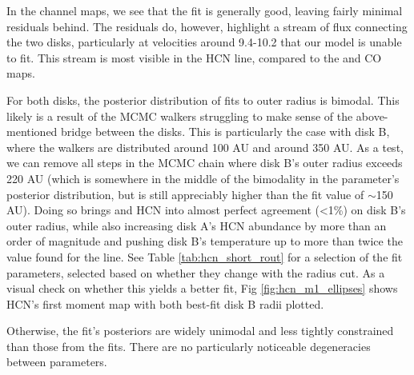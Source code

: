 In the channel maps, we see that the fit is generally good, leaving fairly minimal residuals behind. The residuals do, however, highlight a stream of flux connecting the two disks, particularly at velocities around 9.4-10.2 \kms that our model is unable to fit. This stream is most visible in the HCN line, compared to the \hco and CO maps.

For both disks, the posterior distribution of fits to outer radius is bimodal. This likely is a result of the MCMC walkers struggling to make sense of the above-mentioned bridge between the disks. This is particularly the case with disk B, where the walkers are distributed around 100 AU and around 350 AU. As a test, we can remove all steps in the MCMC chain where disk B's outer radius exceeds 220 AU (which is somewhere in the middle of the bimodality in the parameter's posterior distribution, but is still appreciably higher than the \hco fit value of $\sim$150 AU). Doing so brings \hco and HCN into almost perfect agreement (\textless 1\%) on disk B's outer radius, while also increasing disk A's HCN abundance by more than an order of magnitude and pushing disk B's temperature up to more than twice the value found for the \hco line. See Table \ref{tab:hcn_short_rout} for a selection of the fit parameters, selected based on whether they change with the radius cut. As a visual check on whether this yields a better fit, Fig \ref{fig:hcn_m1_ellipses} shows HCN's first moment map with both best-fit disk B radii plotted.

Otherwise, the fit's posteriors are widely unimodal and less tightly constrained than those from the \hco fits. There are no particularly noticeable degeneracies between parameters.



